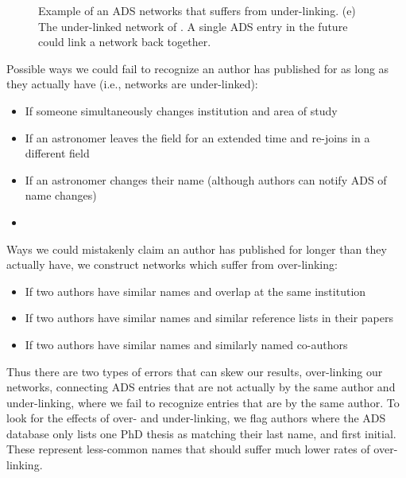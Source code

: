 \documentclass{emulateapj}
\begin{document}
\begin{figure}
  \caption{Example of an ADS networks that suffers from under-linking.  (e) The under-linked network of \citet{Capelo12}.  A single ADS entry in the future could link a network back together.}
\end{figure}


Possible ways we could fail to recognize an author has published for as long as they actually have (i.e., networks are under-linked):
\begin{itemize}
\item{If someone simultaneously changes institution and area of study}
  \item{If an astronomer leaves the field for an extended time and re-joins in a different field}
\item{If an astronomer changes their name (although authors can notify ADS of name changes)}
  \item{}
\end{itemize}

Ways we could mistakenly claim an author has published for longer than they actually have, we construct networks which suffer from over-linking:
\begin{itemize}
\item{If two authors have similar names and overlap at the same institution}
\item{If two authors have similar names and similar reference lists in their papers}
  \item{If two authors have similar names and similarly named co-authors}
\end{itemize}

Thus there are two types of errors that can skew our results, over-linking our networks, connecting ADS entries that are not actually by the same author and under-linking, where we fail to recognize entries that are by the same author.  To look for the effects of over- and under-linking, we flag authors where the ADS database only lists one PhD thesis as matching their last name, and first initial. These represent less-common names that should suffer much lower rates of over-linking.
\end{document}
